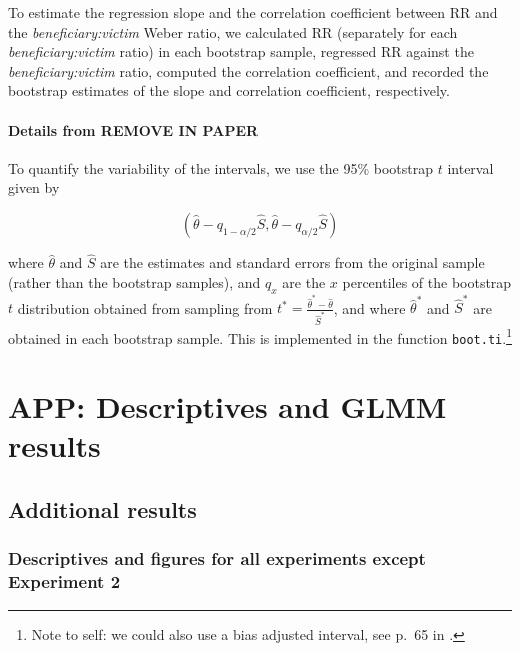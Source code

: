 \documentclass[
]{article}
\begin{document}
To estimate the regression slope and the correlation coefficient between \(\mathrm{RR}\) and the \emph{beneficiary:victim} Weber ratio, we calculated \(\mathrm{RR}\) (separately for each \emph{beneficiary:victim} ratio) in each bootstrap sample, regressed \(\mathrm{RR}\) against the \emph{beneficiary:victim} ratio, computed the correlation coefficient, and recorded the bootstrap estimates of the slope and correlation coefficient, respectively.

\paragraph{\texorpdfstring{Details from \autocite{Hesterberg2015} REMOVE IN PAPER}{Details from {[}@Hesterberg2015{]} REMOVE IN PAPER}}\label{details-from-hesterberg2015-remove-in-paper}

To quantify the variability of the intervals, we use the 95\% bootstrap \(t\) interval given by

\[\left(\hat{\theta} - q_{1-\alpha/2}\hat{S}, \hat{\theta} - q_{\alpha/2}\hat{S}\right)\]

where \(\hat{\theta}\) and \(\hat{S}\) are the estimates and standard errors from the original sample (rather than the bootstrap samples), and \(q_x\) are the \(x\) percentiles of the bootstrap \(t\) distribution obtained from sampling from \(t^* = \frac{\hat{\theta}^* - \hat{\theta}}{\hat{S}^*}\), and where \(\hat{\theta}^*\) and \(\hat{S}^*\) are obtained in each bootstrap sample. This is implemented in the function \texttt{boot.ti}.\footnote{Note to self: we could also use a bias adjusted interval, see p.~65 in \autocite{Hesterberg2015}.}

\section{APP: Descriptives and GLMM results}\label{app:detailed-results}

\subsection{Additional results}\label{app:detailed-results-descriptives}

\subsubsection{Descriptives and figures for all experiments except Experiment 2}\label{descriptives-and-figures-for-all-experiments-except-experiment-2}
\end{document}
